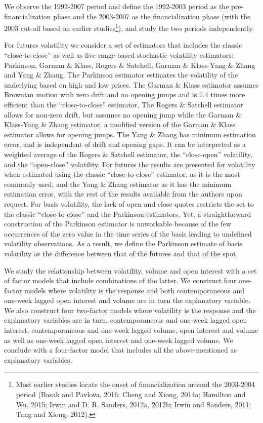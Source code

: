 \documentclass[]{elsarticle} %
\begin{document}
We observe the 1992-2007 period and define the 1992-2003 period as the
pre-financialization phase and the 2003-2007 as the financialization
phase (with the 2003 cut-off based on earlier studies\footnote{Most
  earlier studies locate the onset of financialization around the
  2003-2004 period (Basak and Pavlova, 2016; Cheng and Xiong, 2014a;
  Hamilton and Wu, 2015; Irwin and D. R. Sanders, 2012a, 2012b; Irwin
  and Sanders, 2011; Tang and Xiong, 2012).}), and study the two periods
independently.

For futures volatility we consider a set of estimators that includes the
classic ``close-to-close'' as well as five range-based stochastic
volatility estimators: Parkinson, Garman \& Klass, Rogers \& Satchell,
Garman \& Klass-Yang \& Zhang and Yang \& Zhang. The Parkinson estimator
estimates the volatility of the underlying based on high and low prices.
The Garman \& Klass estimator assumes Brownian motion with zero drift
and no opening jumps and is 7.4 times more efficient than the
``close-to-close'' estimator. The Rogers \& Satchell estimator allows
for non-zero drift, but assumes no opening jump while the Garman \&
Klass-Yang \& Zhang estimator, a modified version of the Garman \& Klass
estimator allows for opening jumps. The Yang \& Zhang has minimum
estimation error, and is independent of drift and opening gaps. It can
be interpreted as a weighted average of the Rogers \& Satchell
estimator, the ``close-open'' volatility, and the ``open-close''
volatility. For futures the results are presented for volatility when
estimated using the classic ``close-to-close'' estimator, as it is the
most commonly used, and the Yang \& Zhang estimator as it has the
minimum estimation error, with the rest of the results available from
the authors upon request. For basis volatility, the lack of open and
close quotes restricts the set to the classic ``close-to-close'' and the
Parkinson estimators. Yet, a straightforward construction of the
Parkinson estimator is unworkable because of the few occurrences of the
zero value in the time series of the basis leading to undefined
volatility observations. As a result, we define the Parkinson estimate
of basis volatility as the difference between that of the futures and
that of the spot.

We study the relationship between volatility, volume and open interest
with a set of factor models that include combinations of the latter. We
construct four one-factor models where volatility is the response and
both contemporaneous and one-week lagged open interest and volume are in
turn the explanatory variable. We also construct four two-factor models
where volatility is the response and the explanatory variables are in
turn, contemporaneous and one-week lagged open interest, contemporaneous
and one-week lagged volume, open interest and volume as well as one-week
lagged open interest and one-week lagged volume. We conclude with a
four-factor model that includes all the above-mentioned as explanatory
variables.
\end{document}
